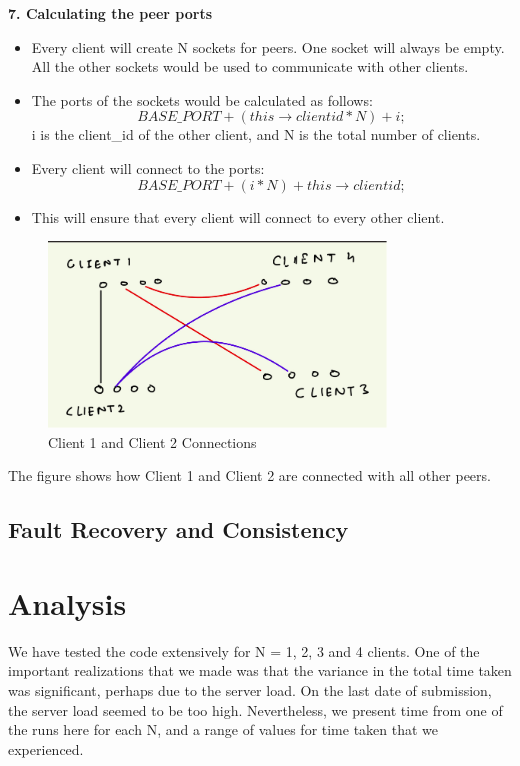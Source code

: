 \documentclass[12pt]{scrartcl}
\begin{document}
\textbf{7. Calculating the peer ports}

\begin{itemize}
    \item Every client will create N sockets for peers. One socket will always be empty. All the other sockets would be used to communicate with other clients.
    \item The ports of the sockets would be calculated as follows: $$BASE\_PORT + (this\rightarrow clientid * N) + i;$$
    i is the client\_id of the other client, and N is the total number of clients.
    \item Every client will connect to the ports:  $$BASE\_PORT + (i * N) + this\rightarrow clientid;$$
    \item This will ensure that every client will connect to every other client.
\end{itemize}
\begin{figure}[H]
    \centering
    \includegraphics[width=0.8\textwidth]{images/Screenshot from 2023-09-05 11-44-09.png}
    \caption{Client 1 and Client 2 Connections}
    \label{fig:my_label}
\end{figure}

\par The figure shows how Client 1 and Client 2 are connected with all other peers.\\

\subsection{Fault Recovery and Consistency}

\section{Analysis}

We have tested the code extensively for N = 1, 2, 3 and 4 clients. One of the important realizations that we made was that the variance in the total time taken was significant, perhaps due to the server load. On the last date of submission, the server load seemed to be too high. Nevertheless, we present time from one of the runs here for each N, and a range of values for time taken that we experienced. 
\end{document}
